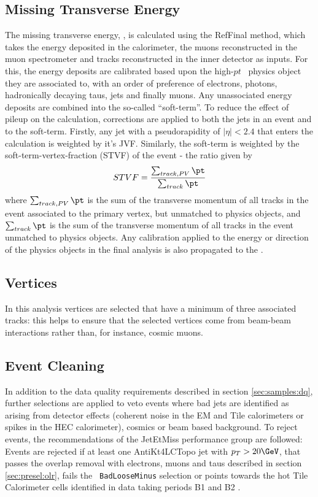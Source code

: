 \subsection{Missing Transverse Energy}
\label{sec:presel:met}

The missing transverse energy, \met, is calculated using the
RefFinal method, which takes the energy
deposited in the calorimeter, the muons reconstructed in the muon
spectrometer and tracks reconstructed in the inner detector as inputs. 
For this, the energy deposits are calibrated based
upon the high-$pt$~ physics object they are associated to, with an order
of preference of electrons, photons, hadronically decaying taus, jets
and finally muons. Any unassociated energy deposits are combined into
the so-called ``soft-term''. To reduce the effect of pileup on the
\met calculation, corrections are applied to both the jets in an event
and to the soft-term. Firstly, any jet with a pseudorapidity of $|\eta|<2.4$
that enters the \met calculation is weighted by it's JVF. Similarly,
the soft-term is weighted by the soft-term-vertex-fraction (STVF) of
the event - the ratio given by
\begin{equation}
STVF = \frac{\sum_{track, PV}\pt}{\sum_{track}\pt}
\end{equation}
where $\sum_{track, PV}\pt$ is the sum of the transverse momentum of
all tracks in the event associated to the primary vertex, but unmatched to physics
objects, and $\sum_{track}\pt$ is the sum of
the transverse momentum of all tracks in the event unmatched to
physics objects. Any calibration applied
to the energy or direction of the physics objects in the final
analysis is also propagated to the \met.


\subsection{Vertices} 
\label{sec:presel:vertices}
In this analysis vertices are selected that have a minimum of three
associated tracks: this helps to ensure that the selected vertices
come from beam-beam interactions rather than, for instance, cosmic
muons.

\subsection{Event Cleaning}
\label{sec:presel:celaning}

In addition to the data quality requirements described in section
\ref{sec:samples:dq}, further selections are applied to veto events
where bad jets are identified as arising from detector effects
(coherent noise in the EM and Tile calorimeters or spikes in the HEC
calorimeter), cosmics or beam based background. To reject events, the
recommendations of the JetEtMiss performance group \cite{TWIKI_JETMET}
are followed: Events are rejected if at least one AntiKt4LCTopo jet
with $p_T>20\GeV$, that passes the overlap removal with electrons,
muons and taus described in section \ref{sec:presel:olr}, fails the {\tt
BadLooseMinus} selection or points towards the hot Tile Calorimeter
cells identified in data taking periods B1 and B2 \cite{hottile}.

